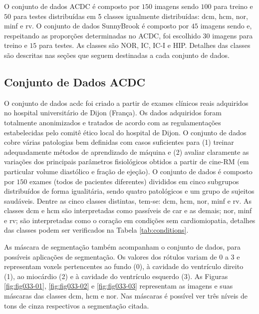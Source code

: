 O conjunto de dados ACDC é composto por $150$ imagens sendo $100$ para treino e $50$ para testes distribuídas em 5 classes igualmente distribuídas: \gls{dcm}, \gls{hcm}, \gls{nor}, \gls{minf} e \gls{rv}. O conjunto de dados SunnyBrook é composto por $45$ imagens sendo e, respeitando as proporções determinadas no ACDC, foi escolhido $30$ imagens para treino e $15$ para testes. As classes são NOR, IC, IC-I e HIP. Detalhes das classes são descritas nas seções que seguem destinadas a cada conjunto de dados.

\subsection{Conjunto de Dados ACDC} 
\label{subsec:cap4_acdc}

O conjunto de dados \gls{acdc} foi criado a partir de exames clínicos reais adquiridos no hospital universitário de Dijon (França). Os dados adquiridos foram totalmente anonimizados e tratados de acordo com as regulamentações estabelecidas pelo comitê ético local do hospital de Dijon. O conjunto de dados cobre várias patologias bem definidas com casos suficientes para (1) treinar adequadamente métodos de aprendizado de máquina e (2) avaliar claramente as variações dos principais parâmetros fisiológicos obtidos a partir de cine-RM (em particular volume diastólico e fração de ejeção). O conjunto de dados é composto por $150$ exames (todos de pacientes diferentes) divididos em cinco subgrupos distribuídos de forma igualitária, sendo quatro patológicos e um grupo de sujeitos saudáveis. Dentre as cinco classes distintas, tem-se: \gls{dcm}, \gls{hcm}, \gls{nor}, \gls{minf} e \gls{rv}. As classes \gls{dcm} e \gls{hcm} são interpretadas como passíveis de \gls{car} e as demais; \gls{nor}, \gls{minf} e \gls{rv}; são interpretadas como o coração em condições sem cardiomiopatia, detalhes das classes podem ser verificados na Tabela \ref{tab:conditions}. 

As máscara de segmentação também acompanham o conjunto de dados, para possíveis aplicações de segmentação. Os valores dos rótulos variam de $0$ a $3$ e representam voxels pertencentes ao fundo (0), à cavidade do ventrículo direito (1), ao miocárdio (2) e à cavidade do ventrículo esquerdo (3). As Figuras \ref{fig:fig033-01}, \ref{fig:fig033-02} e \ref{fig:fig033-03} representam as imagens e suas máscaras das classes \gls{dcm}, \gls{hcm} e \gls{nor}. Nas máscaras é possível ver três níveis de tons de cinza respectivos a segmentação citada.

